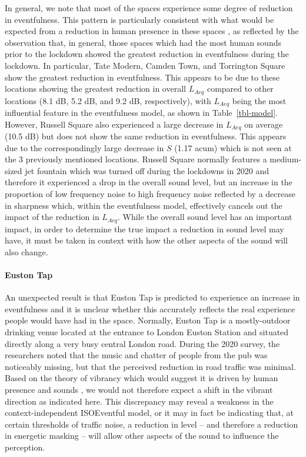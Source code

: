 \documentclass[
  authoryear,
  preprint,
  3p,
  onecolumn]{elsarticle}
\let\oldparagraph\paragraph
\renewcommand{\paragraph}[1]{\oldparagraph{#1}\mbox{}}
\begin{document}
In general, we note that most of the spaces experience some degree of
reduction in eventfulness. This pattern is particularly consistent with
what would be expected from a reduction in human presence in these
spaces \citep{Aletta2018Towards}, as reflected by the observation that,
in general, those spaces which had the most human sounds prior to the
lockdown showed the greatest reduction in eventfulness during the
lockdown. In particular, Tate Modern, Camden Town, and Torrington Square
show the greatest reduction in eventfulness. This appears to be due to
these locations showing the greatest reduction in overall \(L_{Aeq}\)
compared to other locations (8.1 dB, 5.2 dB, and 9.2 dB, respectively),
with \(L_{Aeq}\) being the most influential feature in the eventfulness
model, as shown in Table~\ref{tbl-model}. However, Russell Square also
experienced a large decrease in \(L_{Aeq}\) on average (10.5 dB) but
does not show the same reduction in eventfulness. This appears due to
the correspondingly large decrease in \(S\) (1.17 acum) which is not
seen at the 3 previously mentioned locations. Russell Square normally
features a medium-sized jet fountain which was turned off during the
lockdowns in 2020 and therefore it experienced a drop in the overall
sound level, but an increase in the proportion of low frequency noise to
high frequency noise reflected by a decrease in sharpness which, within
the eventfulness model, effectively cancels out the impact of the
reduction in \(L_{Aeq}\). While the overall sound level has an important
impact, in order to determine the true impact a reduction in sound level
may have, it must be taken in context with how the other aspects of the
sound will also change.

\paragraph{Euston Tap}\label{euston-tap}

An unexpected result is that Euston Tap is predicted to experience an
increase in eventfulness and it is unclear whether this accurately
reflects the real experience people would have had in the space.
Normally, Euston Tap is a mostly-outdoor drinking venue located at the
entrance to London Euston Station and situated directly along a very
busy central London road. During the 2020 survey, the researchers noted
that the music and chatter of people from the pub was noticeably
missing, but that the perceived reduction in road traffic was minimal.
Based on the theory of vibrancy which would suggest it is driven by
human presence and sounds \citep{Aletta2018Towards}, we would not
therefore expect a shift in the vibrant direction as indicated here.
This discrepancy may reveal a weakness in the context-independent
ISOEventful model, or it may in fact be indicating that, at certain
thresholds of traffic noise, a reduction in level -- and therefore a
reduction in energetic masking -- will allow other aspects of the sound
to influence the perception.
\end{document}
